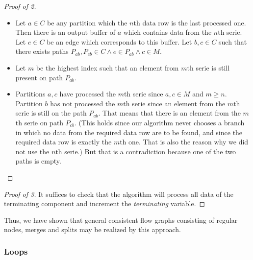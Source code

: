 \begin{claim}
\begin{proof}[Proof of 2]
\begin{itemize}
    \item Let $a \in C$ be any partition which the $n$th data row is the last processed one. Then there is an output buffer of $a$ which contains data from the $n$th serie. Let $e \in C$ be an edge which corresponds to this buffer.  Let $b,c \in C$ such that there exists paths $P_{ab}, P_{cb} \in C \land e \in P_{ab} \land c \in M$. 

    \item Let $m$ be the highest index such that an element from $m$th serie is still present on path $P_{ab}$. 

    \item Partitions $a,c$ have processed the $m$th serie since $a,c \in M$ and $m \geq n$. Partition $b$ has not processed the $m$th serie since an element from the $m$th serie is still on the path $P_{ab}$. That means that there is an element from the $m$th serie on path $P_{cb}$. (This holds since our algorithm never chooses a branch in which no data from the required data row are to be found, and since the required data row is exactly the $m$th one. That is also the reason why we did not use the $n$th serie.) But that is a contradiction because one of the two paths is empty.

  \end{itemize}

\end{proof}
\begin{proof}[Proof of 3]
It suffices to check that the algorithm will process all data of the terminating component and increment the \emph{terminating} variable.
\end{proof}
\end{claim}

Thus, we have shown that general consistent flow graphs consisting of regular nodes, merges and splits may be realized by this approach.

\subsubsection{Loops}


